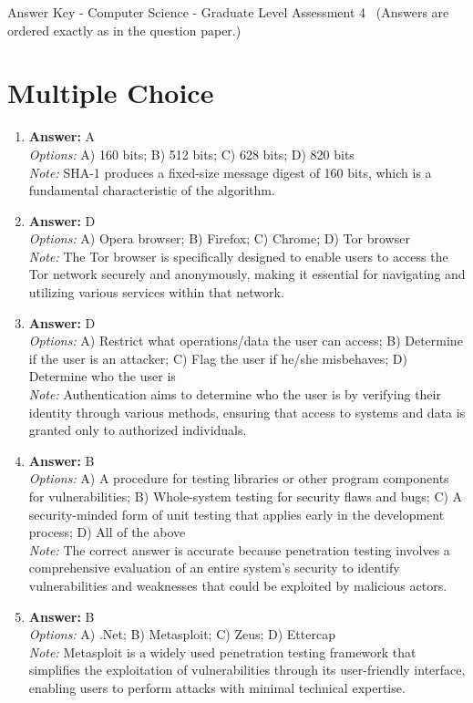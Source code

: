\documentclass[12pt]{article}
\begin{document}
\begin{center}
Answer Key - Computer Science - Graduate Level Assessment 4 \
\small (Answers are ordered exactly as in the question paper.)
\end{center}

\section*{Multiple Choice}
\begin{enumerate}[label=\arabic*.]
\item \textbf{Answer:} A
\\ \textit{Options:} A) 160 bits; B) 512 bits; C) 628 bits; D) 820 bits
\\ \textit{Note:} SHA-1 produces a fixed-size message digest of 160 bits, which is a fundamental characteristic of the algorithm.
\item \textbf{Answer:} D
\\ \textit{Options:} A) Opera browser; B) Firefox; C) Chrome; D) Tor browser
\\ \textit{Note:} The Tor browser is specifically designed to enable users to access the Tor network securely and anonymously, making it essential for navigating and utilizing various services within that network.
\item \textbf{Answer:} D
\\ \textit{Options:} A) Restrict what operations/data the user can access; B) Determine if the user is an attacker; C) Flag the user if he/she misbehaves; D) Determine who the user is
\\ \textit{Note:} Authentication aims to determine who the user is by verifying their identity through various methods, ensuring that access to systems and data is granted only to authorized individuals.
\item \textbf{Answer:} B
\\ \textit{Options:} A) A procedure for testing libraries or other program components for vulnerabilities; B) Whole-system testing for security flaws and bugs; C) A security-minded form of unit testing that applies early in the development process; D) All of the above
\\ \textit{Note:} The correct answer is accurate because penetration testing involves a comprehensive evaluation of an entire system's security to identify vulnerabilities and weaknesses that could be exploited by malicious actors.
\item \textbf{Answer:} B
\\ \textit{Options:} A) .Net; B) Metasploit; C) Zeus; D) Ettercap
\\ \textit{Note:} Metasploit is a widely used penetration testing framework that simplifies the exploitation of vulnerabilities through its user-friendly interface, enabling users to perform attacks with minimal technical expertise.
\end{enumerate}
\end{document}
